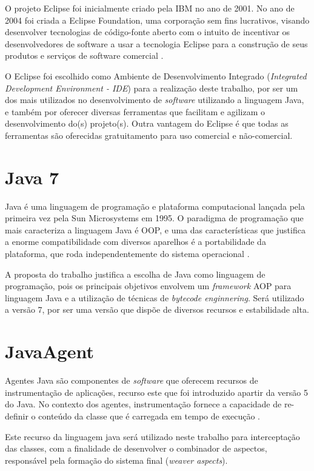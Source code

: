 \documentclass[tc,openright]{iiufrgs}
\begin{document}
O projeto Eclipse foi inicialmente criado pela IBM no ano de 2001. No ano de 2004 foi criada a Eclipse Foundation, uma corporação sem fins lucrativos, visando desenvolver tecnologias de código-fonte aberto com o intuito de incentivar os desenvolvedores de software a usar a tecnologia Eclipse para a construção de seus produtos e serviços de software comercial \cite{eclipsefoundation}.

O Eclipse foi escolhido como Ambiente de Desenvolvimento Integrado (\textit{Integrated Development Environment - IDE}) para a realização deste trabalho, por ser um dos mais utilizados no desenvolvimento de \textit{software} utilizando a linguagem Java, e também por oferecer diversas ferramentas que facilitam e agilizam o desenvolvimento do(s) projeto(s). Outra vantagem do Eclipse é que todas as ferramentas são oferecidas gratuitamento para uso comercial e não-comercial. 
\section{Java 7}

Java é uma linguagem de programação e plataforma computacional lançada pela primeira vez pela Sun Microsystems em 1995.  O paradigma de programação que mais caracteriza a linguagem Java é OOP,  e uma das características que justifica a enorme compatibilidade com diversos aparelhos é a portabilidade da plataforma, que roda independentemente do sistema operacional \cite{stark2001java}. 

A proposta do trabalho justifica a escolha de Java como linguagem de programação, pois os principais objetivos envolvem um \textit{framework} AOP para linguagem Java e a utilização de técnicas de \textit{bytecode enginnering}. Será utilizado a versão 7, por ser uma versão que dispõe de diversos recursos e estabilidade alta.

\section{JavaAgent}

Agentes Java são componentes de \textit{software} que oferecem recursos de instrumentação de aplicações, recurso este que foi introduzido apartir da versão 5 do Java. No contexto dos agentes, instrumentação fornece a capacidade de re-definir o conteúdo da classe que é carregada  em tempo de execução \cite{javaagents}.

Este recurso da linguagem java será utilizado neste trabalho para interceptação das classes, com a finalidade de desenvolver o combinador de aspectos, responsável pela formação do sistema final (\textit{weaver aspects}).
\end{document}
